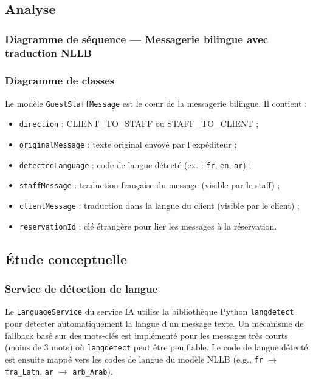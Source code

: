 \subsection{Analyse}

\subsubsection{Diagramme de séquence — Messagerie bilingue avec traduction NLLB}


\subsubsection{Diagramme de classes}


Le modèle \texttt{GuestStaffMessage} est le cœur de la messagerie bilingue. Il contient :
\begin{itemize}
  \item \texttt{direction} : CLIENT\_TO\_STAFF ou STAFF\_TO\_CLIENT ;
  \item \texttt{originalMessage} : texte original envoyé par l'expéditeur ;
  \item \texttt{detectedLanguage} : code de langue détecté (ex. : \texttt{fr}, \texttt{en}, \texttt{ar}) ;
  \item \texttt{staffMessage} : traduction française du message (visible par le staff) ;
  \item \texttt{clientMessage} : traduction dans la langue du client (visible par le client) ;
  \item \texttt{reservationId} : clé étrangère pour lier les messages à la réservation.
\end{itemize}

\subsection{Étude conceptuelle}

\subsubsection{Service de détection de langue}

Le \texttt{LanguageService} du service IA utilise la bibliothèque Python \texttt{langdetect} pour détecter automatiquement la langue d'un message texte. Un mécanisme de fallback basé sur des mots-clés est implémenté pour les messages très courts (moins de 3 mots) où \texttt{langdetect} peut être peu fiable. Le code de langue détecté est ensuite mappé vers les codes de langue du modèle NLLB (e.g., \texttt{fr} $\rightarrow$ \texttt{fra\_Latn}, \texttt{ar} $\rightarrow$ \texttt{arb\_Arab}).

